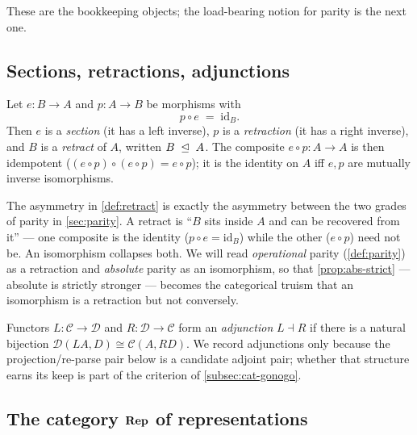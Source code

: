 These are the bookkeeping objects; the load-bearing notion for parity is the
next one.

\subsection{Sections, retractions, adjunctions}
\label{subsec:retraction}

\begin{definition}
\label{def:retract}
Let $e:B\to A$ and $p:A\to B$ be morphisms with
\begin{equation}
  \label{eq:retract}
  p\circ e \;=\; \mathrm{id}_B.
\end{equation}
Then $e$ is a \emph{section} (it has a left inverse), $p$ is a
\emph{retraction} (it has a right inverse), and $B$ is a \emph{retract} of
$A$, written $B \;\trianglelefteq\; A$. The composite $e\circ p:A\to A$ is then
idempotent ($(e\circ p)\circ(e\circ p)=e\circ p$); it is the identity on $A$
iff $e,p$ are mutually inverse isomorphisms.
\end{definition}

The asymmetry in \cref{def:retract} is exactly the asymmetry between the two
grades of parity in \cref{sec:parity}. A retract is ``$B$ sits inside $A$ and
can be recovered from it'' --- one composite is the identity ($p\circ
e=\mathrm{id}_B$) while the other ($e\circ p$) need not be. An isomorphism
collapses both. We will read \emph{operational} parity (\cref{def:parity}) as
a retraction and \emph{absolute} parity as an isomorphism, so that
\cref{prop:abs-strict} --- absolute is strictly stronger --- becomes the
categorical truism that an isomorphism is a retraction but not conversely.

\begin{definition}[Adjunction]
\label{def:adjunction}
Functors $L:\mathcal{C}\to\mathcal{D}$ and $R:\mathcal{D}\to\mathcal{C}$ form
an \emph{adjunction} $L\dashv R$ if there is a natural bijection
$\mathcal{D}(L A, D)\cong\mathcal{C}(A, R D)$. We record adjunctions only
because the projection/re-parse pair below is a candidate adjoint pair; whether
that structure earns its keep is part of the criterion of
\cref{subsec:cat-gonogo}.
\end{definition}

\subsection{The category $\mathbf{Rep}$ of representations}
\label{subsec:catrep}

